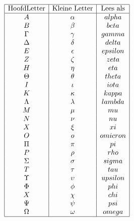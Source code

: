 \documentclass[lineaire_algebra_oplossingen.tex]{subfiles}
\begin{document}
\begin{center}
\[
\begin{array}{| c | c | c |}
\hline
\text{HoofdLetter} & \text{Kleine Letter}	& \text{Lees als}\\
\hline
A			& \alpha	& alpha\\
B			& \beta		& beta\\
\Gamma 		& \gamma 	& gamma\\
\Delta 		& \delta 	& delta\\
E			& \epsilon	& epsilon\\
Z			& \zeta		& zeta\\
H			& \eta 		& eta\\
\Theta 		& \theta 	& theta\\
I			& \iota 	& iota\\
K			& \kappa 	& kappa\\
\Lambda 	& \lambda	& lambda\\
M			& \mu 		& mu\\
N			& \nu 		& nu\\
X 			& \xi 		& xi\\
O			& o			& omicron\\
\Pi 		& \pi 		& pi\\
P			& \rho 		& rho\\
\Sigma 		& \sigma 	& sigma\\
T			& \tau 		& tau\\
\Upsilon 	& \upsilon 	& upsilon\\
\Phi 		& \phi 		& phi\\
X			& \chi 		& chi\\
\Psi 		& \psi 		& psi\\
\Omega 		& \omega	& omega\\
\hline
\end{array}
\]
\end{center}
\end{document}
